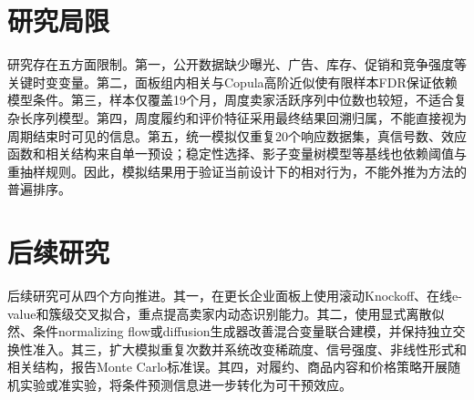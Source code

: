 \documentclass{sufethesismas}
\begin{document}
\section{研究局限}

研究存在五方面限制。第一，公开数据缺少曝光、广告、库存、促销和竞争强度等关键时变变量。第二，面板组内相关与Copula高阶近似使有限样本FDR保证依赖模型条件。第三，样本仅覆盖19个月，周度卖家活跃序列中位数也较短，不适合复杂长序列模型。第四，周度履约和评价特征采用最终结果回溯归属，不能直接视为周期结束时可见的信息。第五，统一模拟仅重复20个响应数据集，真信号数、效应函数和相关结构来自单一预设；稳定性选择、影子变量树模型等基线也依赖阈值与重抽样规则。因此，模拟结果用于验证当前设计下的相对行为，不能外推为方法的普遍排序。

\section{后续研究}

后续研究可从四个方向推进。其一，在更长企业面板上使用滚动Knockoff、在线e-value和簇级交叉拟合，重点提高卖家内动态识别能力。其二，使用显式离散似然、条件normalizing flow或diffusion生成器改善混合变量联合建模，并保持独立交换性准入。其三，扩大模拟重复次数并系统改变稀疏度、信号强度、非线性形式和相关结构，报告Monte Carlo标准误。其四，对履约、商品内容和价格策略开展随机实验或准实验，将条件预测信息进一步转化为可干预效应。
\end{document}
